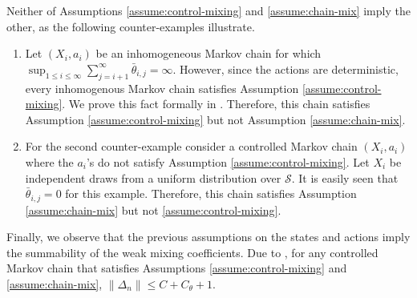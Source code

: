 \documentclass[twoside,11pt]{article}
\numberwithin{equation}{section}
\begin{document}
Neither of Assumptions \ref{assume:control-mixing} and \ref{assume:chain-mix} imply the other, as the following counter-examples illustrate.
\begin{enumerate}
    \item Let $(X_i,a_i)$ be an inhomogeneous Markov chain for which  
    $
    \sup_{1\leq i\leq \infty}\sum_{j=i+1}^\infty \bar \theta_{i,j}=\infty.
    $
   However, since the actions are deterministic, every inhomogenous Markov chain satisfies Assumption \ref{assume:control-mixing}. We prove this fact formally in . Therefore, this chain satisfies Assumption \ref{assume:control-mixing} but not Assumption \ref{assume:chain-mix}.
    \item For the second counter-example consider a controlled Markov chain $(X_i,a_i)$ where the $a_i$'s do not satisfy Assumption \ref{assume:control-mixing}. Let $X_i$ be independent draws from a uniform distribution over $\mathcal S$. It is easily seen that $\bar\theta_{i,j}=0$ for this example. Therefore, this chain satisfies Assumption \ref{assume:chain-mix} but not \ref{assume:control-mixing}.
\end{enumerate}

Finally, we observe that the previous assumptions on the states and actions imply the summability of the weak mixing coefficients. 
Due to \citet[Lemma 3]{banerjee2025off}, for any controlled Markov chain that satisfies Assumptions \ref{assume:control-mixing} and \ref{assume:chain-mix},
$
    \lVert\Delta_n\rVert\leq C+C_{\theta}+1.
$
\end{document}
